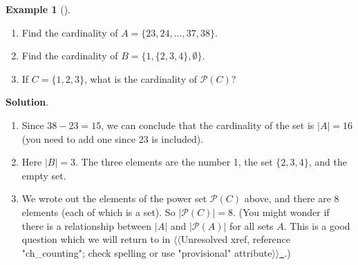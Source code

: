 \documentclass[10pt,]{book}
\theoremstyle{plain}
\theoremstyle{definition}
\theoremstyle{definition}
\newtheorem{example}[theorem]{Example}
\theoremstyle{definition}
\theoremstyle{definition}
\numberwithin{equation}{chapter}
\def\pow{\mathcal P}
\newcommand{\card}[1]{\left| #1 \right|}
\begin{document}
\begin{example}[]\label{example-42}
\hypertarget{p-1501}{}%
\leavevmode%
\begin{enumerate}
\item\hypertarget{li-458}{}\hypertarget{p-1502}{}%
Find the cardinality of \(A = \{23, 24, \ldots, 37, 38\}\).%
\item\hypertarget{li-459}{}\hypertarget{p-1503}{}%
Find the cardinality of \(B = \{1, \{2, 3, 4\}, \emptyset\}\).%
\item\hypertarget{li-460}{}\hypertarget{p-1504}{}%
If \(C = \{1,2,3\}\), what is the cardinality of \(\pow(C)\)?%
\end{enumerate}
%
\par\smallskip%
\noindent\textbf{Solution}.\hypertarget{solution-131}{}\quad%
\hypertarget{p-1505}{}%
\leavevmode%
\begin{enumerate}
\item\hypertarget{li-461}{}\hypertarget{p-1506}{}%
Since \(38 - 23 = 15\), we can conclude that the cardinality of the set is \(|A| = 16\) (you need to add one since 23 is included).%
\item\hypertarget{li-462}{}\hypertarget{p-1507}{}%
Here \(|B| = 3\). The three elements are the number 1, the set \(\{2,3,4\}\), and the empty set.%
\item\hypertarget{li-463}{}\hypertarget{p-1508}{}%
We wrote out the elements of the power set \(\pow(C)\) above, and there are 8 elements (each of which is a set). So \(\card{\pow(C)} = 8\).  (You might wonder if there is a relationship between \(\card{A}\) and \(\card{\pow(A)}\) for all sets \(A\).  This is a good question which we will return to in {$\langle\langle$Unresolved xref, reference "ch\_counting"; check spelling or use "provisional" attribute$\rangle\rangle$}\hyperlink{}{~}.)%
\end{enumerate}
%
\end{example}
\typeout{************************************************}
\typeout{************************************************}
\end{document}
